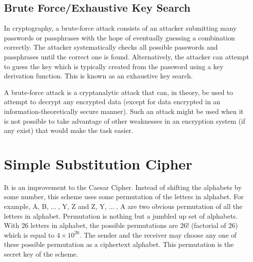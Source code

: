 \documentclass[british]{report}
\begin{document}
\subsection{Brute Force/Exhaustive Key Search}

In cryptography, a brute-force attack consists of an attacker submitting
many passwords or passphrases with the hope of eventually guessing
a combination correctly. The attacker systematically checks all possible
passwords and passphrases until the correct one is found. Alternatively,
the attacker can attempt to guess the key which is typically created
from the password using a key derivation function. This is known as
an exhaustive key search.

A brute-force attack is a cryptanalytic attack that can, in theory,
be used to attempt to decrypt any encrypted data (except for data
encrypted in an information-theoretically secure manner). Such an
attack might be used when it is not possible to take advantage of
other weaknesses in an encryption system (if any exist) that would
make the task easier.

\pagebreak{}

\section{Simple Substitution Cipher}

It is an improvement to the Caesar Cipher. Instead of shifting the
alphabets by some number, this scheme uses some permutation of the
letters in alphabet. For example, A, B, $\ldots\:$, Y, Z and Z, Y,
$\ldots\:$, A are two obvious permutation of all the letters in alphabet.
Permutation is nothing but a jumbled up set of alphabets. With 26
letters in alphabet, the possible permutations are 26! (factorial
of 26) which is equal to $4\times10^{26}$. The sender and the receiver
may choose any one of these possible permutation as a ciphertext alphabet.
This permutation is the secret key of the scheme.
\end{document}
